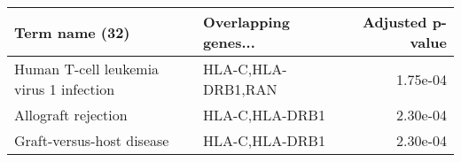 \begin{tabular}{llr}
\toprule
                         Term name (32) & Overlapping genes... &  Adjusted p-value \\
\midrule
Human T-cell leukemia virus 1 infection &   HLA-C,HLA-DRB1,RAN &          1.75e-04 \\
                    Allograft rejection &       HLA-C,HLA-DRB1 &          2.30e-04 \\
              Graft-versus-host disease &       HLA-C,HLA-DRB1 &          2.30e-04 \\
\bottomrule
\end{tabular}

